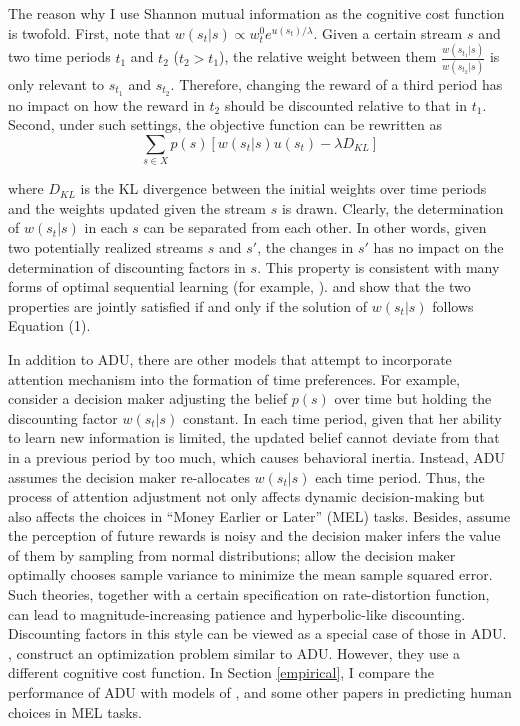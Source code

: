 \documentclass[
  12pt,
]{article}
\begin{document}
The reason why I use Shannon mutual information as the cognitive cost
function is twofold. First, note that
\(w(s_t|s) \propto w^0_t e^{u(s_t)/\lambda}\). Given a certain stream
\(s\) and two time periods \(t_1\) and \(t_2\) (\(t_2>t_1\)), the
relative weight between them \(\frac{w(s_{t_1}|s)}{w(s_{t_2}|s)}\) is
only relevant to \(s_{t_1}\) and \(s_{t_2}\). Therefore, changing the
reward of a third period has no impact on how the reward in \(t_2\)
should be discounted relative to that in \(t_1\). Second, under such
settings, the objective function can be rewritten as\[
\sum_{s\in X} p(s)[w(s_t|s)u(s_t) - \lambda D_{KL}]
\]

where \(D_{KL}\) is the KL divergence between the initial weights over
time periods and the weights updated given the stream \(s\) is drawn.
Clearly, the determination of \(w(s_t|s)\) in each \(s\) can be
separated from each other. In other words, given two potentially
realized streams \(s\) and \(s'\), the changes in \(s'\) has no impact
on the determination of discounting factors in \(s\). This property is
consistent with many forms of optimal sequential learning (for example,
\citet{zhong_optimal_2022} ). \citet{matejka_rational_2015} and
\citet{caplin_rationally_2022} show that the two properties are jointly
satisfied if and only if the solution of \(w(s_t|s)\) follows Equation
(1).

In addition to ADU, there are other models that attempt to incorporate
attention mechanism into the formation of time preferences. For example,
\citet{steiner_rational_2017} consider a decision maker adjusting the
belief \(p(s)\) over time but holding the discounting factor
\(w(s_t|s)\) constant. In each time period, given that her ability to
learn new information is limited, the updated belief cannot deviate from
that in a previous period by too much, which causes behavioral inertia.
Instead, ADU assumes the decision maker re-allocates \(w(s_t|s)\) each
time period. Thus, the process of attention adjustment not only affects
dynamic decision-making but also affects the choices in ``Money Earlier
or Later'' (MEL) tasks. Besides, \citet{gabaix_myopia_2017} assume the
perception of future rewards is noisy and the decision maker infers the
value of them by sampling from normal distributions;
\citet{gershman_rationally_2020} allow the decision maker optimally
chooses sample variance to minimize the mean sample squared error. Such
theories, together with a certain specification on rate-distortion
function, can lead to magnitude-increasing patience and hyperbolic-like
discounting. Discounting factors in this style can be viewed as a
special case of those in ADU. \citet{noor_optimal_2022},
\citet{noor_constrained_2023} construct an optimization problem similar
to ADU. However, they use a different cognitive cost function. In
Section \ref{empirical}, I compare the performance of ADU with models of
\citet{gershman_rationally_2020}, \citet{noor_optimal_2022} and some
other papers in predicting human choices in MEL tasks.
\end{document}
